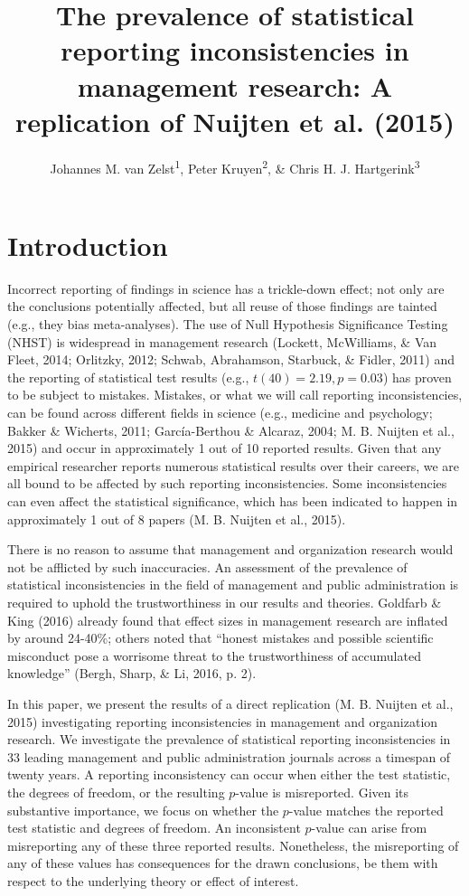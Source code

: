 \documentclass[english,floatsintext,man]{apa6}
\title{The prevalence of statistical reporting inconsistencies in management
research: A replication of Nuijten et al. (2015)}
\author{Johannes M. van Zelst\textsuperscript{1}, Peter Kruyen\textsuperscript{2}, \& Chris H. J. Hartgerink\textsuperscript{3}}
\affiliation{
    \vspace{0.5cm}
          \textsuperscript{1} Department of Organization Studies, Tilburg University\\
          \textsuperscript{2} Department of Public Administration, Radboud University Nijmegen\\
          \textsuperscript{3} Department of Methodology and Statistics, Tilburg University  }
\begin{document}
\maketitle

\setcounter{secnumdepth}{0}



\section{Introduction}\label{introduction}

Incorrect reporting of findings in science has a trickle-down effect;
not only are the conclusions potentially affected, but all reuse of
those findings are tainted (e.g., they bias meta-analyses). The use of
Null Hypothesis Significance Testing (NHST) is widespread in management
research (Lockett, McWilliams, \& Van Fleet, 2014; Orlitzky, 2012;
Schwab, Abrahamson, Starbuck, \& Fidler, 2011) and the reporting of
statistical test results (e.g., \(t(40)=2.19,p=0.03\)) has proven to be
subject to mistakes. Mistakes, or what we will call reporting
inconsistencies, can be found across different fields in science (e.g.,
medicine and psychology; Bakker \& Wicherts, 2011; García-Berthou \&
Alcaraz, 2004; M. B. Nuijten et al., 2015) and occur in approximately 1
out of 10 reported results. Given that any empirical researcher reports
numerous statistical results over their careers, we are all bound to be
affected by such reporting inconsistencies. Some inconsistencies can
even affect the statistical significance, which has been indicated to
happen in approximately 1 out of 8 papers (M. B. Nuijten et al., 2015).

There is no reason to assume that management and organization research
would not be afflicted by such inaccuracies. An assessment of the
prevalence of statistical inconsistencies in the field of management and
public administration is required to uphold the trustworthiness in our
results and theories. Goldfarb \& King (2016) already found that effect
sizes in management research are inflated by around 24-40\%; others
noted that \enquote{honest mistakes and possible scientific misconduct
pose a worrisome threat to the trustworthiness of accumulated knowledge}
(Bergh, Sharp, \& Li, 2016, p. 2).

In this paper, we present the results of a direct replication (M. B.
Nuijten et al., 2015) investigating reporting inconsistencies in
management and organization research. We investigate the prevalence of
statistical reporting inconsistencies in 33 leading management and
public administration journals across a timespan of twenty years. A
reporting inconsistency can occur when either the test statistic, the
degrees of freedom, or the resulting \(p\)-value is misreported. Given
its substantive importance, we focus on whether the \(p\)-value matches
the reported test statistic and degrees of freedom. An inconsistent
\(p\)-value can arise from misreporting any of these three reported
results. Nonetheless, the misreporting of any of these values has
consequences for the drawn conclusions, be them with respect to the
underlying theory or effect of interest.
\end{document}
